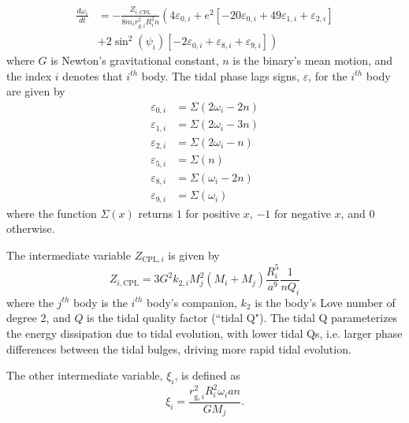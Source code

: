 \begin{equation} \label{sync:eqn:cpl:omega}
\begin{split}
\frac{d\omega_i}{dt}& = -\frac{Z_{i,\mathrm{CPL}}}{8m_i r_{g,i}^2 R_i^2 n} \left(4 \varepsilon_{0,i} + e^2\left[-20\varepsilon_{0,i} + 49\varepsilon_{1,i} + \varepsilon_{2,i} \right] \right. \\
& \left. + 2 \sin^2(\psi_i) \left[ -2 \varepsilon_{0,i} + \varepsilon_{8,i} + \varepsilon_{9,i} \right] \right)
\end{split}
\end{equation}
where $G$ is Newton's gravitational constant, $n$ is the binary's mean motion, and the index $i$ denotes that $i^{th}$ body. The tidal phase lags signs, $\varepsilon$, for the $i^{th}$ body are given by
\begin{equation} \label{sync:eqn:cpl:eps}
\begin{split}
\varepsilon_{0,i} & = \Sigma(2 \omega_i - 2n) \\
\varepsilon_{1,i} & = \Sigma(2 \omega_i - 3n) \\
\varepsilon_{2,i} & = \Sigma(2 \omega_i - n) \\
\varepsilon_{5,i} & = \Sigma(n) \\
\varepsilon_{8,i} & = \Sigma(\omega_i - 2n) \\
\varepsilon_{9,i} & = \Sigma(\omega_i)
\end{split}
\end{equation}
where the function $\Sigma(x)$ returns $1$ for positive $x$, $-1$ for negative $x$, and $0$ otherwise.

The intermediate variable $Z_{\mathrm{CPL},i}$ is given by
\begin{equation} \label{sync:eqn:cpl:z}
Z_{i,\mathrm{CPL}} = 3 G^2 k_{2,i} M_j^2 (M_i + M_j) \frac{R_i^5}{a^9} \frac{1}{n Q_i}
\end{equation}
where the $j^{th}$ body is the $i^{th}$ body's companion, $k_{2}$ is the body's Love number of degree 2, and $Q$ is the tidal quality factor (``tidal Q"). The tidal Q parameterizes the energy dissipation due to tidal evolution, with lower tidal Qs, i.e. larger phase differences between the tidal bulges, driving more rapid tidal evolution.

The other intermediate variable, $\xi_i$, is defined as
\begin{equation}\label{sync:eqn:cpl:chi}
\xi_i = \frac{r_{\mathrm{g},i}^2 R_i^2 \omega_i a n }{ G M_j}.
\end{equation}

